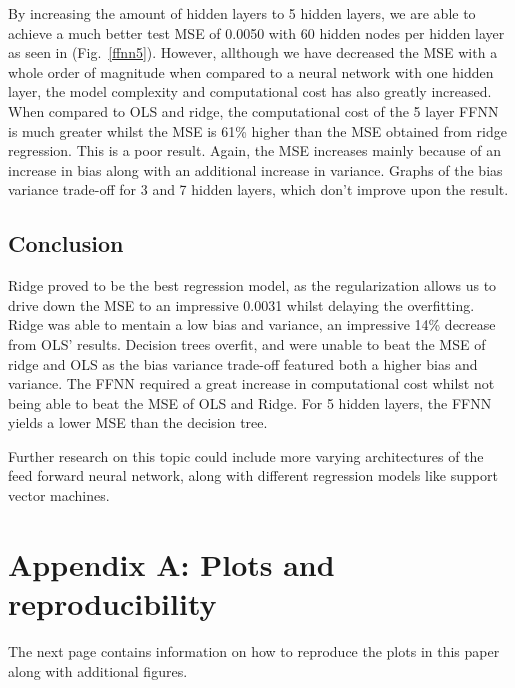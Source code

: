 \documentclass[onecolumn,10pt,cleanfoot]{asme2ej}
\begin{document}
By increasing the amount of hidden layers to 5 hidden layers, we are able to achieve a much better test MSE of 0.0050 with 60 hidden nodes per hidden layer as seen in (Fig.~\ref{ffnn5}). However, allthough we have decreased the MSE with a whole order of magnitude when compared to a neural network with one hidden layer, the model complexity and computational cost has also greatly increased. When compared to OLS and ridge, the computational cost of the 5 layer FFNN is much greater whilst the MSE is 61\% higher than the MSE obtained from ridge regression. This is a poor result. Again, the MSE increases mainly because of an increase in bias along with an additional increase in variance. Graphs of the bias variance trade-off for 3 and 7 hidden layers, which don't improve upon the result.

\subsection{Conclusion}
Ridge proved to be the best regression model, as the regularization allows us to drive down the MSE to an impressive 0.0031 whilst delaying the overfitting. Ridge was able to mentain a low bias and variance, an impressive 14\% decrease from OLS' results. Decision trees overfit, and were unable to beat the MSE of ridge and OLS as the bias variance trade-off featured both a higher bias and variance. The FFNN required a great increase in computational cost whilst not being able to beat the MSE of OLS and Ridge. For 5 hidden layers, the FFNN yields a lower MSE than the decision tree.

Further research on this topic could include more varying architectures of the feed forward neural network, along with different regression models like support vector machines.




\section*{Appendix A: Plots and reproducibility}

The next page contains information on how to reproduce the plots in this paper along with additional figures.
\end{document}
